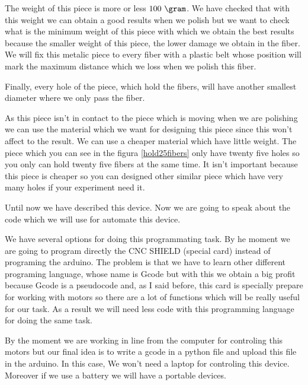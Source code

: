 \begin{itemize}
The weight of this piece is more or less $100~\gram$. We have checked that with this weight we can obtain a good results when we polish but we want to check what is the minimum weight of this piece with which we obtain the best results because the smaller weight of this piece, the lower damage we obtain in the fiber. We will fix this metalic piece to every fiber with a plastic belt whose position will mark the maximum distance which we loss when we polish this fiber. 

Finally, every hole of the piece, which hold the fibers, will have another smallest diameter where we only pass the fiber.

As this piece isn't in contact to the piece which is moving when we are polishing we can use the material which we want for designing this piece since this won't affect to the result. We can use a cheaper material which have little weight. The piece which you can see in the figura \ref{hold25fibers} only have twenty five holes so you only can hold twenty five fibers at the same time. It isn't important because this piece is cheaper so you can designed other similar piece which have very many holes if your experiment need it. 
\end{itemize}

Until now we have described this device. Now we are going to speak about the code which we will use for automate this device. 

We have several options for doing this programmating task. By he moment we are going to program directly the CNC SHIELD (special card) instead of programing the arduino. The problem is that we have to learn other different programing language, whose name is Gcode but with this we obtain a big profit because Gcode is a pseudocode and, as I said before, this card is specially prepare for working with motors so there are a lot of functions which will be really useful for our task. As a result we will need less code with this programming language for doing the same task.     

By the moment we are working in line from the computer for controling this motors but our final idea is to write a gcode in a python file and upload this file in the arduino. In this case, We won't need a laptop for controling this device. Moreover if we use a battery we will have a portable devices.